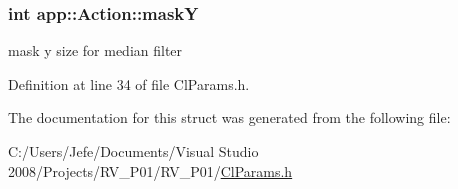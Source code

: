 \subsubsection[{mask\+Y}]{\setlength{\rightskip}{0pt plus 5cm}int app\+::\+Action\+::mask\+Y}\label{structapp_1_1_action_afe83b5f2be56b2282be6f81e0c2d6e28}


mask y size for median filter 



Definition at line 34 of file Cl\+Params.\+h.



The documentation for this struct was generated from the following file\+:\begin{DoxyCompactItemize}
\item 
C\+:/\+Users/\+Jefe/\+Documents/\+Visual Studio 2008/\+Projects/\+R\+V\+\_\+\+P01/\+R\+V\+\_\+\+P01/\hyperlink{_cl_params_8h}{Cl\+Params.\+h}\end{DoxyCompactItemize}
